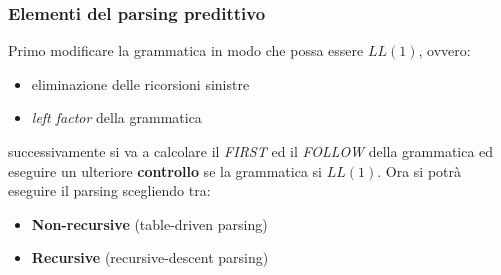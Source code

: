 \subsubsection{Elementi del parsing predittivo}
Primo modificare la grammatica in modo che possa essere $LL(1)$, ovvero:
\begin{itemize}
\item eliminazione delle ricorsioni sinistre
\item \textit{left factor} della grammatica
\end{itemize}

successivamente si va a calcolare il \textit{FIRST} ed il \textit{FOLLOW} della
grammatica ed eseguire un ulteriore \textbf{controllo} se la grammatica si
$LL(1)$. Ora si potr\`a eseguire il parsing scegliendo tra:
\begin{itemize}
\item \textbf{Non-recursive} (table-driven parsing)
\item \textbf{Recursive} (recursive-descent parsing)
\end{itemize}
